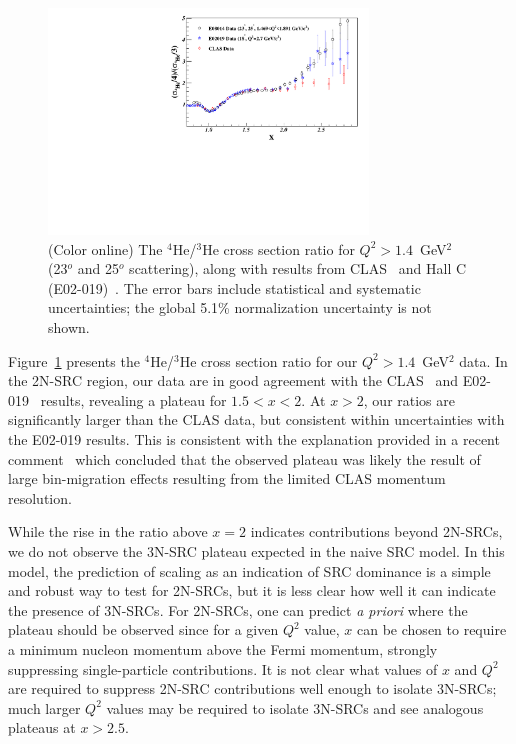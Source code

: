 \documentclass[aps,prl,superscriptaddress,showpacs,twocolumn,floatfix,amsmath,amssymb]{revtex4-1}
\begin{document}
%

\begin{figure}[!ht]
    \begin{center}
        \includegraphics[width=8.5cm,angle=0]{He4_He3_XS_Ratio.pdf}
    \end{center}
    \vspace*{-6.mm}
    \caption{(Color online) The $^4$He/$^3$He cross section ratio for $Q^2>1.4$~GeV$^2$ (23$^o$ and 25$^o$ scattering),
        along with results from CLAS~\cite{PhysRevLett.96.082501} and Hall C (E02-019)~\cite{fomin2012}. The error bars include
        statistical and systematic uncertainties; the global 5.1\% normalization uncertainty is not shown.}
    \label{fig:ratios_highqsq}
\end{figure}

Figure~\ref{fig:ratios_highqsq} presents the $^4$He/$^3$He cross section ratio for our $Q^2 > 1.4$~GeV$^2$
data. In the 2N-SRC region, our data are in good agreement with the CLAS~\cite{PhysRevLett.96.082501} and
E02-019~\cite{fomin2012} results, revealing a plateau for $1.5 < x < 2$. At $x>2$, our
ratios are significantly larger than the CLAS data, but consistent within uncertainties with the E02-019
results. This is consistent with the explanation provided in a recent comment~\cite{Higinbotham:2014xna}
which concluded that the observed plateau was likely the result of large bin-migration effects resulting from
the limited CLAS momentum resolution.

While the rise in the ratio above $x=2$ indicates contributions beyond 2N-SRCs, we do not observe the 3N-SRC
plateau expected in the naive SRC model. In this model, the prediction of scaling as an indication of SRC
dominance is a simple and robust way to test for 2N-SRCs, but it is less clear how well it can indicate the
presence of 3N-SRCs. For 2N-SRCs, one can predict \textit{a priori} where the plateau should be observed
since for a given $Q^2$ value, $x$ can be chosen to require a minimum nucleon momentum above the Fermi
momentum, strongly suppressing single-particle contributions. It is not clear what values of $x$ and $Q^2$
are required to suppress 2N-SRC contributions well enough to isolate 3N-SRCs; much larger $Q^2$ values may
be required to isolate 3N-SRCs and see analogous plateaus at $x>2.5$.
\end{document}
